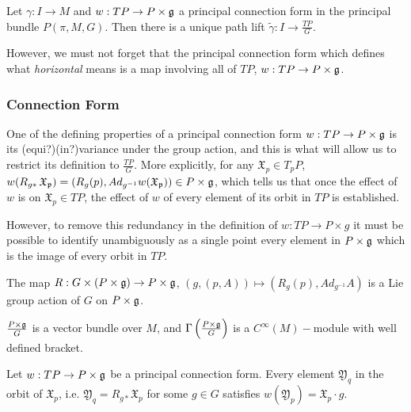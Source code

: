 \begin{theorem}
Let $\gamma:I \to M$ and $w:TP \to P \times \mathfrak{g}$ a principal connection form in the principal bundle $P(\pi, M, G)$. Then there is a unique path lift $\tilde{\gamma}:I \to \frac{TP}{G}$.
\end{theorem}

However, we must not forget that the principal connection form which defines what \emph{horizontal} means is  a map involving all of $TP$, $w:TP \to P\times \mathfrak{g}$. 

\subsubsection{Connection Form}

One of the defining properties of a principal connection form $w:TP \to P \times \mathfrak{g}$ is its (equi?)(in?)variance under the group action, and this is what will allow us to restrict its definition to $\frac{TP}{G}$. More explicitly, for any $\mathfrak X_p \in T_p P$, $w(R_{g*}\,\mathfrak{X_p}) = (R_g(p), Ad_{g^{-1}} w(\mathfrak{X_p})) \in P \times \mathfrak{g}$, which tells us that once the effect of $w$ is on $\mathfrak{X}_p \in TP$, the effect of $w$ of every element of its orbit in $TP$ is established.

However, to remove this redundancy in the definition of $w:TP \to P \times g$ it must be possible to identify unambiguously as a single point every element in $P \times \mathfrak{g}$ which is the image of every orbit in $TP$.

\begin{proposition}
The map $R:G \times (P \times \mathfrak{g}) \to P \times \mathfrak{g}$, $(g, (p, A)) \mapsto (R_g(p), Ad_{g^{-1}} A)$ is a Lie group action of $G$ on $P \times \mathfrak{g}$.
\end{proposition}

\begin{definition}
$\frac{P \times \mathfrak{g}}{G}$ is a vector bundle over $M$, and $\Gamma \left(\frac{P \times \mathfrak{g}}{G} \right)$ is a $C^\infty(M)-$module with well defined bracket.
\end{definition}

\begin{proposition}
Let $w:TP \to P \times \mathfrak{g}$ be a principal connection form. Every element $\mathfrak{Y}_q$ in the orbit of $\mathfrak{X}_p$, i.e. $\mathfrak{Y}_q = R_{g*} \mathfrak{X}_p$ for some $g\in G$ satisfies $w(\mathfrak{Y}_p) = \mathfrak{X}_p \cdot g$.
\end{proposition}

